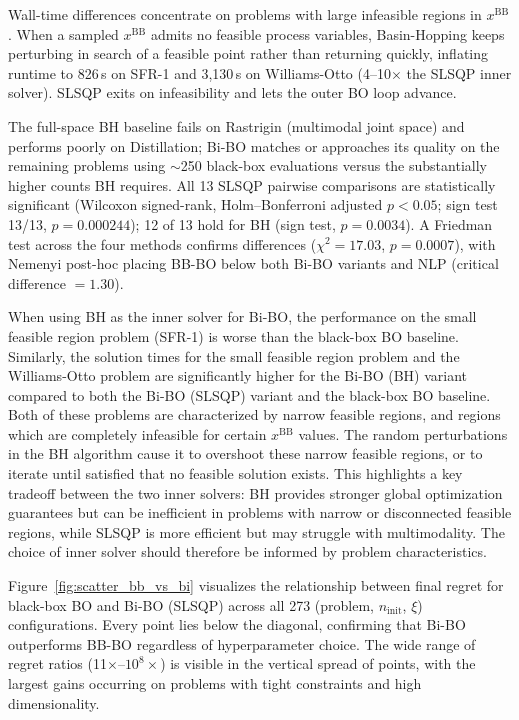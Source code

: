 \documentclass[12pt,a4paper]{article}%
\theoremstyle{plain}%
\theoremstyle{remark}%
\theoremstyle{definition}%
\def\BB{\mathrm{BB}}
\begin{document}
Wall-time differences concentrate on problems with large infeasible regions in $x^{\BB}$. When a sampled $x^{\BB}$ admits no feasible process variables, Basin-Hopping keeps perturbing in search of a feasible point rather than returning quickly, inflating runtime to 826\,s on SFR-1 and 3{,}130\,s on Williams-Otto (4--10$\times$ the SLSQP inner solver). SLSQP exits on infeasibility and lets the outer BO loop advance.

The full-space BH baseline fails on Rastrigin (multimodal joint space) and performs poorly on Distillation; Bi-BO matches or approaches its quality on the remaining problems using $\sim$250 black-box evaluations versus the substantially higher counts BH requires. All 13 SLSQP pairwise comparisons are statistically significant (Wilcoxon signed-rank, Holm--Bonferroni adjusted $p < 0.05$; sign test 13/13, $p = 0.000244$); 12 of 13 hold for BH (sign test, $p = 0.0034$). A Friedman test across the four methods confirms differences ($\chi^2 = 17.03$, $p = 0.0007$), with Nemenyi post-hoc placing BB-BO below both Bi-BO variants and NLP (critical difference $= 1.30$).

When using BH as the inner solver for Bi-BO, the performance on the small feasible region problem (SFR-1) is worse than the black-box BO baseline. Similarly, the solution times for the small feasible region problem and the Williams-Otto problem are significantly higher for the Bi-BO (BH) variant compared to both the Bi-BO (SLSQP) variant and the black-box BO baseline. Both of these problems are characterized by narrow feasible regions, and regions which are completely infeasible for certain $x^{\BB}$ values. The random perturbations in the BH algorithm cause it to overshoot these narrow feasible regions, or to iterate until satisfied that no feasible solution exists. This highlights a key tradeoff between the two inner solvers: BH provides stronger global optimization guarantees but can be inefficient in problems with narrow or disconnected feasible regions, while SLSQP is more efficient but may struggle with multimodality. The choice of inner solver should therefore be informed by problem characteristics.

Figure~\ref{fig:scatter_bb_vs_bi} visualizes the relationship between final regret for black-box BO and Bi-BO (SLSQP) across all 273 (problem, $n_\text{init}$, $\xi$) configurations. Every point lies below the diagonal, confirming that Bi-BO outperforms BB-BO regardless of hyperparameter choice. The wide range of regret ratios (11$\times$--$10^{8}\times$) is visible in the vertical spread of points, with the largest gains occurring on problems with tight constraints and high dimensionality.
\end{document}
